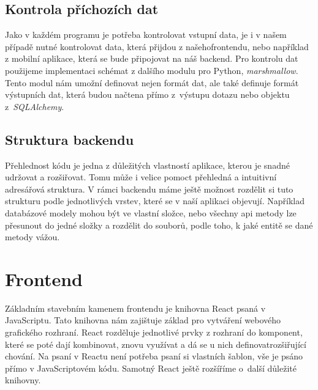 \subsection{Kontrola příchozích dat}

Jako v každém programu je potřeba kontrolovat vstupní data, je i v našem případě nutné kontrolovat data, která přijdou z našeho\linebreak frontendu, nebo například z mobilní aplikace,
která se bude připojovat na náš backend. Pro kontrolu dat použijeme implementaci schémat z dalšího modulu pro Python, \textit{marshmallow}. Tento modul nám umožní definovat
nejen formát dat, ale také definuje formát výstupních dat, která budou načtena přímo z~výstupu dotazu nebo objektu z~\textit{SQLAlchemy}.

\subsection{Struktura backendu}

Přehlednost kódu je jedna z důležitých vlastností aplikace, kterou je snadné udržovat a rozšiřovat. Tomu může i velice pomoct přehledná a intuitivní adresářová struktura.
V rámci backendu máme ještě možnost rozdělit si tuto strukturu podle jednotlivých vrstev, které se v naší aplikaci objevují. Například databázové modely mohou být ve vlastní složce,
nebo všechny \gls{api} metody lze přesunout do jedné složky a rozdělit do souborů, podle toho, k jaké entitě se dané metody vážou.

\begin{listing}[H]
\end{listing}


\section{Frontend}

Základním stavebním kamenem frontendu je knihovna React psaná v JavaScriptu. Tato knihovna nám zajištuje základ pro vytváření webového grafického rozhraní. React rozděluje
jednotlivé prvky z rozhraní do komponent, které se poté dají kombinovat, znovu využívat a dá se u nich definovat\linebreak rozšiřující chování. Na psaní v Reactu není potřeba psaní
si vlastních šablon, vše je psáno přímo v JavaScriptovém kódu. \cite{reactJS} Samotný React ještě rozšíříme o~další důležité knihovny.

